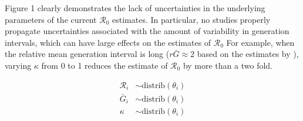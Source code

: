 \documentclass[12pt]{article}
\begin{document}
Figure 1 clearly demonstrates the lack of uncertainties in the underlying parameters
of the current $\mathcal R_0$ estimates.
In particular, no studies properly propagate uncertainties associated with the
amount of variability in generation intervals, which can have 
large effects on the estimates of $\mathcal R_0$
For example, when the relative mean generation interval is long ($r\bar{G}\approx 2$ based on the estimates by \cite{zhaoncov}),
varying $\kappa$ from 0 to 1 reduces the estimate of $\mathcal R_0$ by more than a two fold.

\begin{equation}
\begin{aligned}
\mathcal R_i &\sim \textrm{distrib}(\theta_i)\\
\bar G_i &\sim \textrm{distrib}(\theta_i)\\
\kappa &\sim \textrm{distrib}(\theta_i)\\
\end{aligned}
\end{equation}


\end{document}
